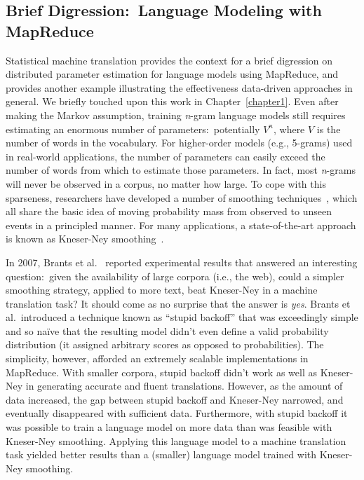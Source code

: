 \subsection{Brief Digression:\ Language Modeling with MapReduce}

Statistical machine translation provides the context for a brief
digression on distributed parameter estimation for language models
using MapReduce, and provides another example illustrating the
effectiveness data-driven approaches in general.  We briefly touched
upon this work in Chapter~\ref{chapter1}.  Even after making the
Markov assumption, training \emph{n}-gram language models still
requires estimating an enormous number of parameters:\ potentially
$V^n$, where $V$ is the number of words in the vocabulary.  For
higher-order models (e.g., 5-grams) used in real-world applications,
the number of parameters can easily exceed the number of words from
which to estimate those parameters.  In fact, most \emph{n}-grams will
never be observed in a corpus, no matter how large.  To cope with this
sparseness, researchers have developed a number of smoothing
techniques~\cite{Manning_Schutze_1999}, which all share the basic idea
of moving probability mass from observed to unseen events in a
principled manner.  For many applications, a state-of-the-art approach
is known as Kneser-Ney smoothing~\cite{Chen_Goodman_ACL1996}.

In 2007, Brants et al.~\cite{Brants_etal_EMNLP2007} reported
experimental results that answered an interesting question:\ given the
availability of large corpora (i.e., the web), could a simpler
smoothing strategy, applied to more text, beat Kneser-Ney in a machine
translation task?  It should come as no surprise that the answer is
\emph{yes}. Brants et al.\ introduced a technique known as ``stupid
backoff'' that was exceedingly simple and so na\"{i}ve that the
resulting model didn't even define a valid probability distribution
(it assigned arbitrary scores as opposed to probabilities).  The
simplicity, however, afforded an extremely scalable implementations in
MapReduce.  With smaller corpora, stupid backoff didn't work as well
as Kneser-Ney in generating accurate and fluent translations.
However, as the amount of data increased, the gap between stupid
backoff and Kneser-Ney narrowed, and eventually disappeared with
sufficient data.  Furthermore, with stupid backoff it was possible to
train a language model on more data than was feasible with Kneser-Ney
smoothing.  Applying this language model to a machine translation task
yielded better results than a (smaller) language model trained with
Kneser-Ney smoothing.

